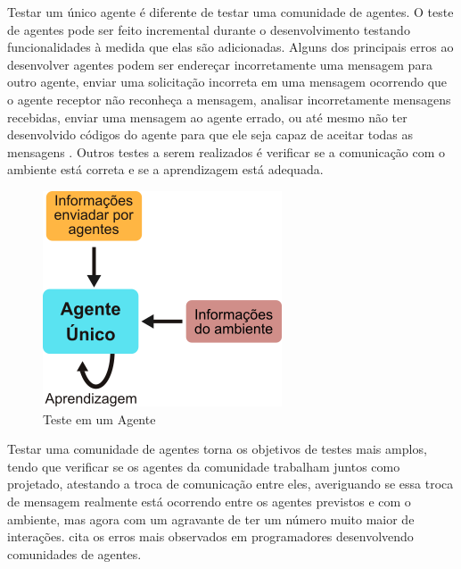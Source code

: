 \documentclass[dm,ppgcomp]{texfurg} %
\begin{document}

Testar um único agente é diferente de testar uma comunidade de agentes. O teste de agentes pode ser feito incremental durante o desenvolvimento testando funcionalidades à medida que elas são adicionadas. Alguns dos principais erros ao desenvolver agentes podem ser endereçar incorretamente uma mensagem para outro agente, enviar uma solicitação incorreta em uma mensagem ocorrendo que o agente receptor não reconheça a mensagem, analisar incorretamente mensagens recebidas, enviar uma mensagem ao agente errado, ou até mesmo não ter desenvolvido códigos do agente para que ele seja capaz de aceitar todas as mensagens \cite{rouff2002test}. Outros testes a serem realizados é verificar se a comunicação com o ambiente está correta e se a aprendizagem está adequada.

\begin{figure}[ht]
\centering
\includegraphics[scale=0.5]{imagens/agente_unico.png}
\caption{Teste em um Agente}
\label{single}
\end{figure}

Testar uma comunidade de agentes torna os objetivos de testes mais amplos, tendo que verificar se os agentes da comunidade trabalham juntos como projetado, atestando a troca de comunicação entre eles, averiguando se essa troca de mensagem realmente está ocorrendo entre os agentes previstos  e  com o ambiente, mas agora com um agravante de ter um número muito maior de interações. \cite{rouff2002test} cita os erros mais observados em programadores desenvolvendo comunidades de agentes.
\end{document}
